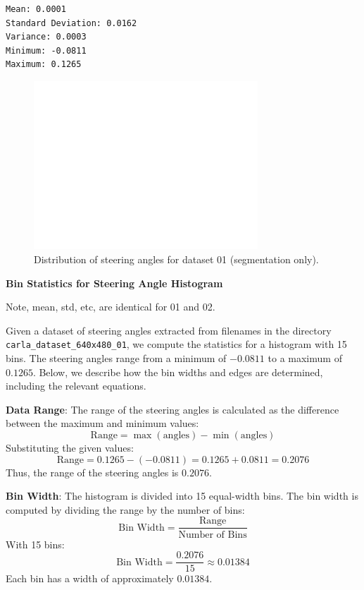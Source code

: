 \begin{verbatim}
Mean: 0.0001
Standard Deviation: 0.0162
Variance: 0.0003
Minimum: -0.0811
Maximum: 0.1265
\end{verbatim}

\begin{figure}[h]
    \centering
    \includegraphics[width=0.75\textwidth]{Figures/Methods/steering_angle_distribution_carla_dataset_640x480_01.png}
    \caption{Distribution of steering angles for dataset 01 (segmentation only).}
    \label{fig:/steering_angle_distribution_carla_dataset_640x480_01}
\end{figure}

\textbf{Bin Statistics for Steering Angle Histogram}

Note, mean, std, etc, are identical for 01 and 02.

Given a dataset of steering angles extracted from filenames in the directory \texttt{carla\_dataset\_640x480\_01}, we compute the statistics for a histogram with 15 bins. The steering angles range from a minimum of $-0.0811$ to a maximum of $0.1265$. Below, we describe how the bin widths and edges are determined, including the relevant equations.

\textbf{Data Range}:
The range of the steering angles is calculated as the difference between the maximum and minimum values:
\begin{equation}
\text{Range} = \max(\text{angles}) - \min(\text{angles})
\end{equation}
Substituting the given values:
\begin{equation}
\text{Range} = 0.1265 - (-0.0811) = 0.1265 + 0.0811 = 0.2076
\end{equation}
Thus, the range of the steering angles is $0.2076$.

\textbf{Bin Width}: 
The histogram is divided into 15 equal-width bins. The bin width is computed by dividing the range by the number of bins:
\begin{equation}
\text{Bin Width} = \frac{\text{Range}}{\text{Number of Bins}}
\end{equation}
With 15 bins:
\begin{equation}
\text{Bin Width} = \frac{0.2076}{15} \approx 0.01384
\end{equation}
Each bin has a width of approximately $0.01384$.

